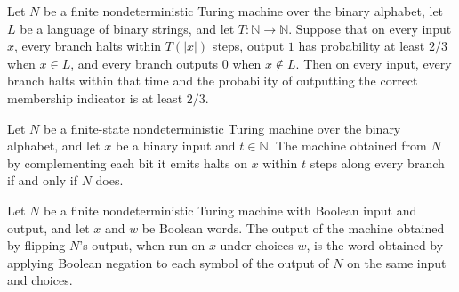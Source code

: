 \begin{theorem}
\label{Turing.FinNDTM.RDecidesInTime.bpDecidesInTime}
\leanok
{}
Let $N$ be a finite nondeterministic Turing machine over the binary alphabet, let $L$ be
a language of binary strings, and let $T:\mathbb{N}\to\mathbb{N}$. Suppose that on every
input $x$, every branch halts within $T(|x|)$ steps, output $1$ has probability at least
$2/3$ when $x\in L$, and every branch outputs $0$ when $x\notin L$. Then on every input,
every branch halts within that time and the probability of outputting the correct
membership indicator is at least $2/3$.
\end{theorem}

\begin{theorem}
\label{Turing.FinNDTM.flipOutput_haltsWithin_iff}
\leanok
{}
Let $N$ be a finite-state nondeterministic Turing machine over the binary alphabet, and
let $x$ be a binary input and $t\in\mathbb{N}$. The machine obtained from $N$ by
complementing each bit it emits halts on $x$ within $t$ steps along every branch if and
only if $N$ does.
\end{theorem}

\begin{theorem}
\label{Turing.FinNDTM.flipOutput_outputWith}
\leanok
{}
Let $N$ be a finite nondeterministic Turing machine with Boolean input and output, and
let $x$ and $w$ be Boolean words. The output of the machine obtained by flipping $N$’s
output, when run on $x$ under choices $w$, is the word obtained by applying Boolean
negation to each symbol of the output of $N$ on the same input and choices.
\end{theorem}

